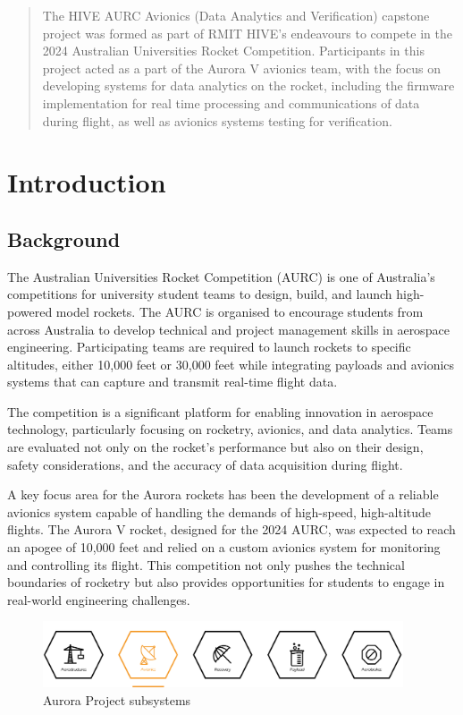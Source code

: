 \pagestyle{fancy}

\begin{abstract}
The HIVE AURC Avionics (Data Analytics and Verification) capstone project was formed as part of RMIT HIVE's endeavours to compete in the 2024 Australian Universities Rocket Competition. Participants in this project acted as a part of the Aurora V avionics team, with the focus on developing systems for data analytics on the rocket, including the firmware implementation for real time processing and communications of data during flight, as well as avionics systems testing for verification.
\end{abstract}

\section{Introduction}

\subsection{Background}
The Australian Universities Rocket Competition (AURC) is one of Australia’s competitions for university student teams to design, build, and launch high-powered model rockets. The AURC is organised to encourage students from across Australia to develop technical and project management skills in aerospace engineering. Participating teams are required to launch rockets to specific altitudes, either 10,000 feet or 30,000 feet while integrating payloads and avionics systems that can capture and transmit real-time flight data. 

The competition is a significant platform for enabling innovation in aerospace technology, particularly focusing on rocketry, avionics, and data analytics. Teams are evaluated not only on the rocket’s performance but also on their design, safety considerations, and the accuracy of data acquisition during flight. 

A key focus area for the Aurora rockets has been the development of a reliable avionics system capable of handling the demands of high-speed, high-altitude flights. The Aurora V rocket, designed for the 2024 AURC, was expected to reach an apogee of 10,000 feet and relied on a custom avionics system for monitoring and controlling its flight. This competition not only pushes the technical boundaries of rocketry but also provides opportunities for students to engage in real-world engineering challenges. 

\begin{figure}[h]
    \begin{center}
        \includegraphics[width=0.95\textwidth]{./img/subsystems_avionics.png}
    \end{center}
    \caption{Aurora Project subsystems}\label{fig:subsystems_avionics}
\end{figure}

